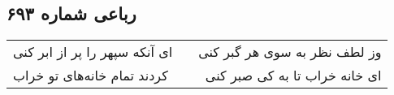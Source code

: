 \begin{center}
\section*{رباعی شماره ۶۹۳}
\label{sec:sh693}
\begin{longtable}{l p{0.5cm} r}
ای آنکه سپهر را پر از ابر کنی
&&
وز لطف نظر به سوی هر گبر کنی
\\
کردند تمام خانه‌های تو خراب
&&
ای خانه خراب تا به کی صبر کنی
\\
\end{longtable}
\end{center}
